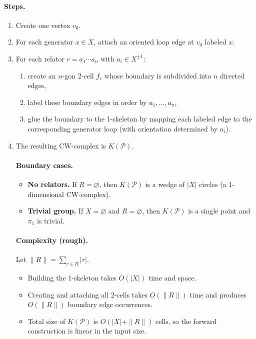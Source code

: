 \documentclass[11pt]{article}
\theoremstyle{definition}
\theoremstyle{plain}
\theoremstyle{remark}
\begin{document}
\paragraph{Steps.}
\begin{enumerate}[leftmargin=2.2em]
\item Create one vertex $v_0$.
\item For each generator $x\in X$, attach an oriented loop edge at $v_0$ labeled $x$.
\item For each relator $r=a_1\cdots a_n$ with $a_i\in X^{\pm1}$:
\begin{enumerate}[leftmargin=2em]
\item create an $n$-gon 2-cell $f_r$ whose boundary is subdivided into $n$ directed edges,
\item label these boundary edges in order by $a_1,\dots,a_n$,
\item glue the boundary to the 1-skeleton by mapping each labeled edge to the corresponding generator loop (with orientation determined by $a_i$).
\end{enumerate}
\item The resulting CW-complex is $K(\mathcal P)$.


\paragraph{Boundary cases.}
\begin{itemize}[leftmargin=2em]
\item \textbf{No relators.} If $R=\varnothing$, then $K(\mathcal P)$ is a wedge of $|X|$ circles (a 1-dimensional CW-complex).
\item \textbf{Trivial group.} If $X=\varnothing$ and $R=\varnothing$, then $K(\mathcal P)$ is a single point and $\pi_1$ is trivial.
\end{itemize}

\paragraph{Complexity (rough).}\cite{hatcher2002,bridsonhaefliger1999}
Let $\|R\|=\sum_{r\in R}|r|$.
\begin{itemize}[leftmargin=2em]
\item Building the 1-skeleton takes $O(|X|)$ time and space.
\item Creating and attaching all 2-cells takes $O(\|R\|)$ time and produces $O(\|R\|)$ boundary edge occurrences.
\item Total size of $K(\mathcal P)$ is $O(|X|+\|R\|)$ cells, so the forward construction is linear in the input size.
\end{itemize}
\end{enumerate}
\end{document}
